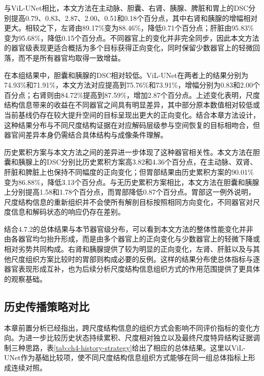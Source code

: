 与ViL-UNet相比，本文方法在主动脉、胆囊、右肾、胰腺、脾脏和胃上的DSC分别提高0.79、0.83、2.87、2.00、0.51和0.18个百分点，其中右肾和胰腺的增幅相对更大。相较之下，左肾由89.17\%变为88.46\%，降低0.71个百分点；肝脏由95.83\%变为95.68\%，降低0.15个百分点。不同器官上的变化并非完全同步，因此本文方法的器官级表现更适合概括为多个目标获得正向变化，同时保留少数器官上的轻微回落，而不是所有器官均取得一致增益。

在本组结果中，胆囊和胰腺的DSC相对较低。ViL-UNet在两者上的结果分别为74.93\%和71.91\%，本文方法对应提高到75.76\%和73.91\%，增幅分别为0.83和2.00个百分点；右肾则由84.72\%提高到87.59\%，增加2.87个百分点。上述变化表明，尺度结构信息带来的收益在不同器官之间具有明显差异，其中部分原本数值相对较低或当前基线仍存在较大提升空间的目标呈现出更大的正向变化。结合本章方法设计，这种结果分布与不同尺度结构证据在对应解码层级参与空间恢复的目标相吻合，但器官间差异本身仍需结合具体结构与成像条件理解。

历史累积方案与本文方法之间的差异进一步体现了这种器官相关性。本文方法在胆囊和胰腺上的DSC分别比历史累积方案高3.82和4.36个百分点，在主动脉、双肾、肝脏和脾脏上也保持不同幅度的正向变化；但胃部结果由历史累积方案的90.01\%变为86.88\%，降低3.13个百分点。与无历史累积方案相比，本文方法在胆囊和胰腺上分别提高1.58和1.78个百分点，而胃部降低0.87个百分点。胃部这一例外说明，尺度结构信息的重新组织并不会使所有解剖目标按照相同方向变化，不同器官对尺度信息和解码状态的响应仍存在差别。

结合4.7.2的总体结果与本节器官级分布，可以看到本文方法的整体性能变化并非由各器官均匀抬升形成，而是由多个器官上的正向变化与少数器官上的轻微下降或相对劣势共同构成。右肾和胰腺提供了较为明显的正向变化，左肾、肝脏以及与其他尺度组织方案比较时的胃部则构成必要的反例。这样的结果分布使总体指标与逐器官表现形成互补，也为后续分析尺度结构信息组织方式的作用范围提供了更具体的观察基础。

\subsection{历史传播策略对比}

本章前置分析已经指出，跨尺度结构信息的组织方式会影响不同评价指标的变化方向。为进一步比较历史状态持续累积、尺度相对独立以及最终尺度特异结构证据调制三种思路，表\ref{tab:ch4-history-strategy}给出了相应的总体结果。这里以ViL-UNet作为基础比较项，使不同尺度结构信息组织方式能够在同一组总体指标上形成连续对照。

